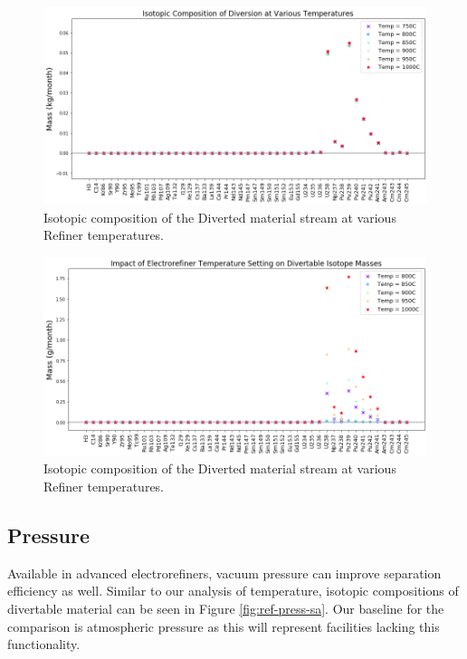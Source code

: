 \begin{figure}
	\includegraphics[width=\linewidth]{images/temperature-sa-comp}
	\caption{Isotopic composition of the Diverted material stream at various Refiner temperatures.}
	\label{fig:ref-temp-sa}
\end{figure}

\begin{figure}
	\includegraphics[width=\linewidth]{images/temperature-sa-diff}
	\caption{Isotopic composition of the Diverted material stream at various Refiner temperatures.}
	\label{fig:ref-temp-diff}
\end{figure}

\subsection{Pressure}

Available in advanced electrorefiners, vacuum pressure can improve separation efficiency as well. Similar to our analysis of temperature, isotopic compositions of
divertable material can be seen in Figure \ref{fig:ref-press-sa}. Our baseline for the comparison is atmospheric pressure as this will represent facilities lacking this
functionality. 

